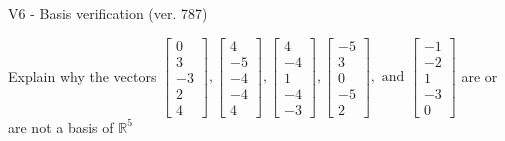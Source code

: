 \begin{exercise}
  \begin{exerciseTitle}V6 - Basis verification (ver. 787)\end{exerciseTitle}
  \begin{exerciseStatement}
    Explain why the vectors \(\left[\begin{array}{r}
0 \\
3 \\
-3 \\
2 \\
4
\end{array}\right] , \left[\begin{array}{r}
4 \\
-5 \\
-4 \\
-4 \\
4
\end{array}\right] , \left[\begin{array}{r}
4 \\
-4 \\
1 \\
-4 \\
-3
\end{array}\right] , \left[\begin{array}{r}
-5 \\
3 \\
0 \\
-5 \\
2
\end{array}\right] , \text{ and } \left[\begin{array}{r}
-1 \\
-2 \\
1 \\
-3 \\
0
\end{array}\right]\) are or are not a basis of \(\mathbb{R}^5\)	



\end{exerciseStatement}
\end{exercise}
